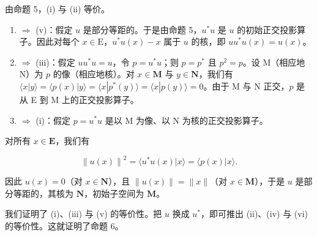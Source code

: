 由命题 5，(i) 与 (ii) 等价。

\begin{enumerate}
\def\labelenumi{(\roman{enumi})}
\item
  \(\Rightarrow\) (v)：假定 \(u\) 是部分等距的。于是由命题 5，\(u^{*}u\) 是 \(u\) 的初始正交投影算子。因此对每个 \(x \in \mathrm{E}\)，\(u^{*}u(x) - x\) 属于 \(u\) 的核，即 \(uu^{*}u(x) = u(x)\)。
\item
  \(\Rightarrow\) (iii)：假定 \(uu^{*}u = u\)，令 \(p = u^{*}u\)；则 \(p = p^{*}\) 且 \(p^2 = p\)。设 M（相应地 N）为 \(p\) 的像（相应地核）。对 \(x \in \mathbf{M}\) 与 \(y \in \mathbf{N}\)，我们有 \(\langle x|y\rangle = \langle p(x)|y\rangle = \langle x|p^{*}(y)\rangle = \langle x|p(y)\rangle = 0\)。由于 M 与 N 正交，\(p\) 是从 E 到 M 上的正交投影算子。
\item
  \(\Rightarrow\) (i)：假定 \(p = u^{*}u\) 是以 M 为像、以 N 为核的正交投影算子。
\end{enumerate}

对所有 \(x\in \mathbf{E}\)，我们有

\[
\left\| u (x) \right\| ^ {2} = \langle u ^ {*} u (x) | x \rangle = \langle p (x) | x \rangle .
\]

因此 \(u(x) = 0\)（对 \(x \in \mathbf{N}\)），且 \(\| u(x) \| = \| x \|\)（对 \(x \in \mathbf{M}\)），于是 \(u\) 是部分等距的，其核为 \(\mathbf{N}\)，初始子空间为 \(\mathbf{M}\)。

我们证明了 (i)、(iii) 与 (v) 的等价性。把 \(u\) 换成 \(u^*\)，即可推出 (ii)、(iv) 与 (vi) 的等价性。这就证明了命题 6。
\relax{}
